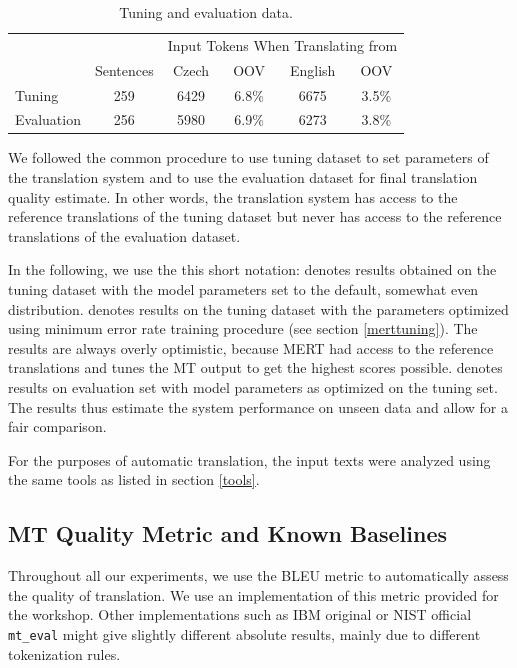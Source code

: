 \documentclass[11pt]{report}
\theoremstyle{plain}
\begin{document}
{{\begin{table}[ht]
\begin{center}
\begin{tabular}{lccccc}
  &    &  \multicolumn{4}{c}{Input Tokens When Translating from}\\
   &  Sentences   &  Czech  &  OOV   &  English  &  OOV\\
\hline
Tuning   &  259  &  6429  &  6.8\%  &  6675  &  3.5\%\\
Evaluation  &  256  &  5980  &  6.9\%  &  6273  &  3.8\%\\
\end{tabular}
\end{center}
\caption{Tuning and evaluation data.}
\label{tuneevaldata}
\end{table}

We followed the common procedure to use tuning dataset to set parameters of the
translation system and to use the evaluation dataset for final translation
quality estimate. In other words, the translation system has access to the
reference translations of the tuning dataset but never has access to the
reference translations of the evaluation dataset.

In the following, we use the this short notation:  denotes
results obtained on the tuning dataset with the model parameters set to the
default, somewhat even distribution.  denotes results on the
tuning dataset with the parameters optimized using minimum error rate training
procedure (see section \ref{merttuning}). The  results are always overly
optimistic, because MERT had access to the reference translations and tunes the
MT output to get the highest scores possible.  denotes results on evaluation set with model parameters as optimized on
the tuning set. The  results thus estimate the system
performance on unseen data and allow for a fair comparison.

For the purposes of automatic translation, the input texts were analyzed using
the same tools as listed in section \ref{tools}.



\subsection{MT Quality Metric and Known Baselines}
\label{baselines}

Throughout all our experiments, we use the BLEU metric 
to automatically assess the quality of translation. We use an implementation of
this metric provided for the workshop. Other implementations such as IBM
original or NIST official {\tt mt\_eval} might give slightly
different absolute results, mainly due to different tokenization rules.

}}
\end{document}
